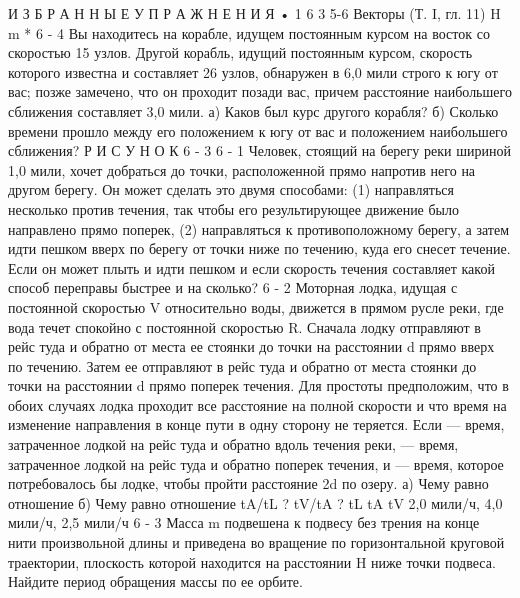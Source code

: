 \documentclass[10pt,oneside]{article}
\begin{document}
И З Б Р А Н Н Ы Е  У П Р А Ж Н Е Н И Я • 1 6 3 5-6 Векторы (Т. I, гл. 11) H m \emph{ } * 6 - 4 Вы находитесь на корабле, идущем постоянным курсом на восток со скоростью 15 узлов. Другой корабль, идущий постоянным курсом, скорость которого известна и составляет 26 узлов, обнаружен в 6,0 мили строго к югу от вас; позже замечено, что он проходит позади вас, причем расстояние наибольшего сближения составляет 3,0 мили. а) Каков был курс другого корабля? б) Сколько времени прошло между его положением к югу от вас и положением наибольшего сближения? Р И С У Н О К  6 - 3 \emph{ } 6 - 1 Человек, стоящий на берегу реки шириной 1,0 мили, хочет добраться до точки, расположенной прямо напротив него на другом берегу. Он может сделать это двумя способами: (1) направляться несколько против течения, так чтобы его результирующее движение было направлено прямо поперек, (2) направляться к противоположному берегу, а затем идти пешком вверх по берегу от точки ниже по течению, куда его снесет течение. Если он может плыть и идти пешком и если скорость течения составляет какой способ переправы быстрее и на сколько? \emph{ } 6 - 2 Моторная лодка, идущая с постоянной скоростью V относительно воды, движется в прямом русле реки, где вода течет спокойно с постоянной скоростью R. Сначала лодку отправляют в рейс туда и обратно от места ее стоянки до точки на расстоянии d прямо вверх по течению. Затем ее отправляют в рейс туда и обратно от места стоянки до точки на расстоянии d прямо поперек течения. Для простоты предположим, что в обоих случаях лодка проходит все расстояние на полной скорости и что время на изменение направления в конце пути в одну сторону не теряется. Если --- время, затраченное лодкой на рейс туда и обратно вдоль течения реки, --- время, затраченное лодкой на рейс туда и обратно поперек течения, и --- время, которое потребовалось бы лодке, чтобы пройти расстояние 2d по озеру. а) Чему равно отношение б) Чему равно отношение tA/tL ? tV/tA ? tL tA tV 2,0 мили/ч, 4,0 мили/ч, 2,5 мили/ч \emph{ } 6 - 3 Масса m подвешена к подвесу без трения на конце нити произвольной длины и приведена во вращение по горизонтальной круговой траектории, плоскость которой находится на расстоянии H ниже точки подвеса. Найдите период обращения массы по ее орбите.\par
\end{document}
